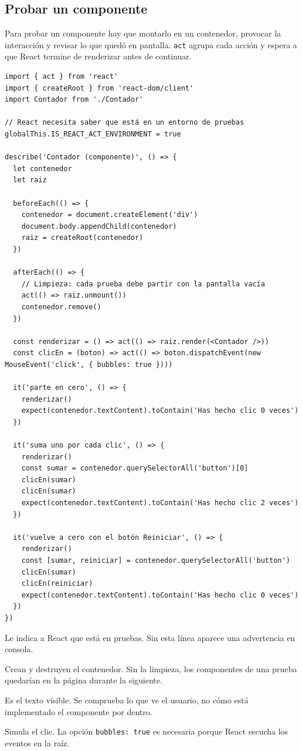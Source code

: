 \documentclass[11pt,a4paper]{article}
\newcommand{\cmd}[1]{\texttt{\color{reactdark}#1}}
\begin{document}
\subsection{Probar un componente}

Para probar un componente hay que montarlo en un contenedor, provocar la interacción y revisar lo que quedó en pantalla. \cmd{act} agrupa cada acción y espera a que React termine de renderizar antes de continuar.

\begin{lstlisting}[language=JSX,title={\small\ttfamily src/components/basicos/Contador.spec.jsx}]
import { act } from 'react'
import { createRoot } from 'react-dom/client'
import Contador from './Contador'

// React necesita saber que está en un entorno de pruebas
globalThis.IS_REACT_ACT_ENVIRONMENT = true

describe('Contador (componente)', () => {
  let contenedor
  let raiz

  beforeEach(() => {
    contenedor = document.createElement('div')
    document.body.appendChild(contenedor)
    raiz = createRoot(contenedor)
  })

  afterEach(() => {
    // Limpieza: cada prueba debe partir con la pantalla vacía
    act(() => raiz.unmount())
    contenedor.remove()
  })

  const renderizar = () => act(() => raiz.render(<Contador />))
  const clicEn = (boton) => act(() => boton.dispatchEvent(new MouseEvent('click', { bubbles: true })))

  it('parte en cero', () => {
    renderizar()
    expect(contenedor.textContent).toContain('Has hecho clic 0 veces')
  })

  it('suma uno por cada clic', () => {
    renderizar()
    const sumar = contenedor.querySelectorAll('button')[0]
    clicEn(sumar)
    clicEn(sumar)
    expect(contenedor.textContent).toContain('Has hecho clic 2 veces')
  })

  it('vuelve a cero con el botón Reiniciar', () => {
    renderizar()
    const [sumar, reiniciar] = contenedor.querySelectorAll('button')
    clicEn(sumar)
    clicEn(reiniciar)
    expect(contenedor.textContent).toContain('Has hecho clic 0 veces')
  })
})
\end{lstlisting}

\begin{description}[leftmargin=0pt, style=nextline, itemsep=0.4em]
\item[\texttt{IS\_REACT\_ACT\_ENVIRONMENT}] Le indica a React que está en pruebas. Sin esta línea aparece una advertencia en consola.
\item[\texttt{beforeEach} y \texttt{afterEach}] Crean y destruyen el contenedor. Sin la limpieza, los componentes de una prueba quedarían en la página durante la siguiente.
\item[\texttt{contenedor.textContent}] Es el texto visible. Se comprueba lo que ve el usuario, no cómo está implementado el componente por dentro.
\item[\texttt{dispatchEvent}] Simula el clic. La opción \cmd{bubbles: true} es necesaria porque React escucha los eventos en la raíz.
\end{description}
\end{document}
